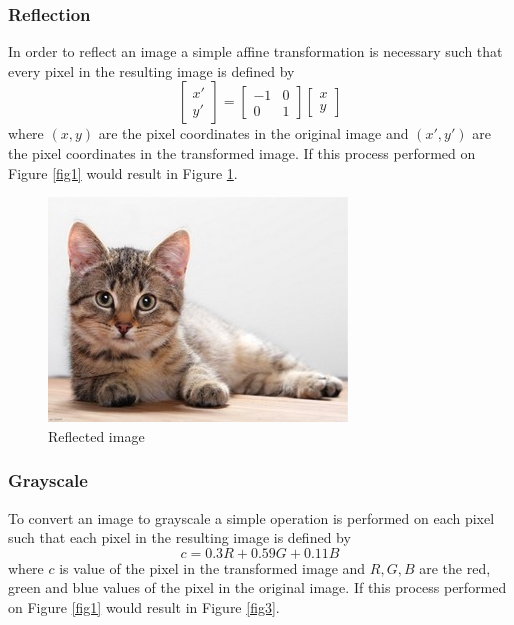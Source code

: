 \documentclass{../mathhomework}
\begin{document}
\subsubsection{Reflection}
In order to reflect an image a simple affine transformation is necessary such that every pixel in the resulting
image is defined by
\begin{equation*}
    \begin{bmatrix}
        x' \\ y'
    \end{bmatrix} =
    \begin{bmatrix}
        -1 & 0 \\
        0 & 1
    \end{bmatrix}
    \begin{bmatrix}
        x \\ y
    \end{bmatrix}
\end{equation*}
where $(x,y)$ are the pixel coordinates in the original image and $(x', y')$ are the pixel coordinates in the transformed image.
If this process performed on Figure \ref{fig1} would result in Figure \ref{fig2}.

\begin{figure}[H]
    \begin{center}
        \includegraphics{figures/reflected.jpg}
    \end{center}

    \caption{Reflected image}\label{fig2}
\end{figure}

\subsubsection{Grayscale}
To convert an image to grayscale a simple operation is performed on each pixel such that each pixel in the resulting 
image is defined by
\begin{equation*}
    c = 0.3R + 0.59G + 0.11B
\end{equation*}
where $c$ is value of the pixel in the transformed image and $R,G,B$ are the red, green and blue values of the pixel in the original image.
If this process performed on Figure \ref{fig1} would result in Figure \ref{fig3}.
\end{document}
